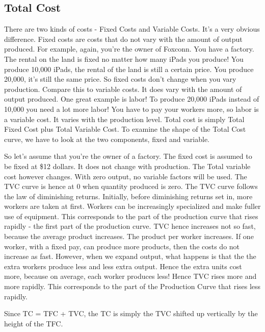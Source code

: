 \subsection{Total Cost}
There are two kinds of costs - Fixed Costs and Variable Costs. It's a very obvious difference. Fixed costs are costs that do not vary with the amount of output produced. For example, again, you're the owner of Foxconn. You have a factory. The rental on the land is fixed no matter how many iPads you produce! You produce 10,000 iPads, the rental of the land is still a certain price. You produce 20,000, it's still the same price. So fixed costs don't change when you vary production. Compare this to variable costs. It does vary with the amount of output produced. One great example is labor! To produce 20,000 iPads instead of 10,000 you need a lot more labor! You have to pay your workers more, so labor is a variable cost. It varies with the production level. Total cost is simply Total Fixed Cost plus Total Variable Cost. To examine the shape of the Total Cost curve, we have to look at the two components, fixed and variable.

So let's assume that you're the owner of a factory. The fixed cost is assumed to be fixed at \$12 dollars. It does not change with production. The Total variable cost however changes. With zero output, no variable factors will be used. The TVC curve is hence at 0 when quantity produced is zero. The TVC curve follows the law of diminishing returns. Initially, before diminishing returns set in, more workers are taken at first. Workers can be increasingly specialized and make fuller use of equipment. This corresponds to the part of the production curve that rises rapidly - the first part of the production curve. TVC hence increases not so fast, because the average product increases. The product per worker increases. If one worker, with a fixed pay, can produce more products, then the costs do not increase as fast. However, when we expand output, what happens is that the the extra workers produce less and less extra output. Hence the extra units cost more, because on average, each worker produces less! Hence TVC rises more and more rapidly. This corresponds to the part of the Production Curve that rises less rapidly. 

 Since TC = TFC + TVC, the TC is simply the TVC shifted up vertically by the height of the TFC.
